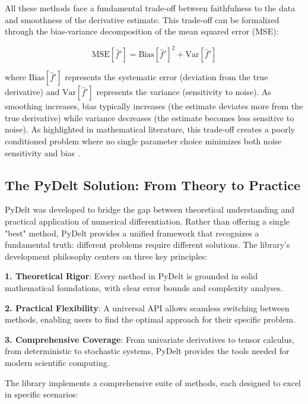 \documentclass[10pt,journal,compsoc]{IEEEtran}
\begin{document}
All these methods face a fundamental trade-off between faithfulness to the data and smoothness of the derivative estimate. This trade-off can be formalized through the bias-variance decomposition of the mean squared error (MSE):

\begin{equation}
    \text{MSE}[\hat{f}'] = \text{Bias}[\hat{f}']^2 + \text{Var}[\hat{f}']
\end{equation}

where $\text{Bias}[\hat{f}']$ represents the systematic error (deviation from the true derivative) and $\text{Var}[\hat{f}']$ represents the variance (sensitivity to noise). As smoothing increases, bias typically increases (the estimate deviates more from the true derivative) while variance decreases (the estimate becomes less sensitive to noise). As highlighted in mathematical literature, this trade-off creates a poorly conditioned problem where no single parameter choice minimizes both noise sensitivity and bias \cite{knowles1995variational}.

\subsection{The PyDelt Solution: From Theory to Practice}

PyDelt was developed to bridge the gap between theoretical understanding and practical application of numerical differentiation. Rather than offering a single "best" method, PyDelt provides a unified framework that recognizes a fundamental truth: different problems require different solutions. The library's development philosophy centers on three key principles:

\textbf{1. Theoretical Rigor}: Every method in PyDelt is grounded in solid mathematical foundations, with clear error bounds and complexity analyses.

\textbf{2. Practical Flexibility}: A universal API allows seamless switching between methods, enabling users to find the optimal approach for their specific problem.

\textbf{3. Comprehensive Coverage}: From univariate derivatives to tensor calculus, from deterministic to stochastic systems, PyDelt provides the tools needed for modern scientific computing.

The library implements a comprehensive suite of methods, each designed to excel in specific scenarios:
\end{document}
